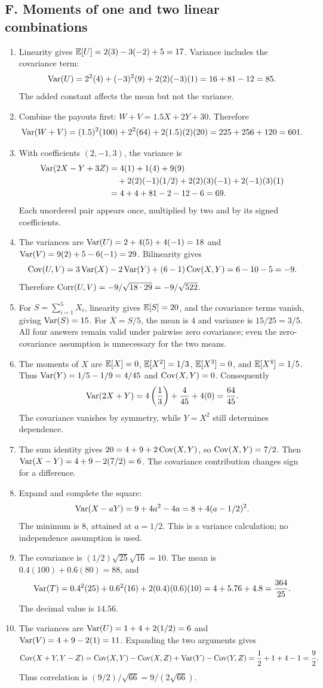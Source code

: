 \subsection{F. Moments of one and two linear combinations}
\begin{enumerate}[label=\textbf{F\arabic*.},leftmargin=*,itemsep=1em]
\item Linearity gives $\mathbb E[U]=2(3)-3(-2)+5=17$. Variance includes the covariance term:
\[
\operatorname{Var}(U)=2^2(4)+(-3)^2(9)+2(2)(-3)(1)=16+81-12=85.
\]
The added constant affects the mean but not the variance.
\item Combine the payouts first: $W+V=1.5X+2Y+30$. Therefore
\[
\operatorname{Var}(W+V)=(1.5)^2(100)+2^2(64)+2(1.5)(2)(20)
=225+256+120=601.
\]
\item With coefficients $(2,-1,3)$, the variance is
\begin{align*}
\operatorname{Var}(2X-Y+3Z)
&=4(1)+1(4)+9(9)\\
&\quad+2(2)(-1)(1/2)+2(2)(3)(-1)+2(-1)(3)(1)\\
&=4+4+81-2-12-6=69.
\end{align*}
Each unordered pair appears once, multiplied by two and by its signed coefficients.
\item The variances are $\operatorname{Var}(U)=2+4(5)+4(-1)=18$ and $\operatorname{Var}(V)=9(2)+5-6(-1)=29$. Bilinearity gives
\[
\operatorname{Cov}(U,V)=3\operatorname{Var}(X)-2\operatorname{Var}(Y)+(6-1)\operatorname{Cov}(X,Y)
=6-10-5=-9.
\]
Therefore $\operatorname{Corr}(U,V)=-9/\sqrt{18\cdot29}=-9/\sqrt{522}$.
\item For $S=\sum_{i=1}^5X_i$, linearity gives $\mathbb E[S]=20$, and the covariance terms vanish, giving $\operatorname{Var}(S)=15$. For $\overline X=S/5$, the mean is $4$ and variance is $15/25=3/5$. All four answers remain valid under pairwise zero covariance; even the zero-covariance assumption is unnecessary for the two means.
\item The moments of $X$ are $\mathbb E[X]=0$, $\mathbb E[X^2]=1/3$, $\mathbb E[X^3]=0$, and $\mathbb E[X^4]=1/5$. Thus $\operatorname{Var}(Y)=1/5-1/9=4/45$ and $\operatorname{Cov}(X,Y)=0$. Consequently
\[
\operatorname{Var}(2X+Y)=4\left(\frac13\right)+\frac4{45}+4(0)=\frac{64}{45}.
\]
The covariance vanishes by symmetry, while $Y=X^2$ still determines dependence.
\item The sum identity gives $20=4+9+2\operatorname{Cov}(X,Y)$, so $\operatorname{Cov}(X,Y)=7/2$. Then $\operatorname{Var}(X-Y)=4+9-2(7/2)=6$. The covariance contribution changes sign for a difference.
\item Expand and complete the square:
\[
\operatorname{Var}(X-aY)=9+4a^2-4a=8+4(a-1/2)^2.
\]
The minimum is $8$, attained at $a=1/2$. This is a variance calculation; no independence assumption is used.
\item The covariance is $(1/2)\sqrt{25}\sqrt{16}=10$. The mean is $0.4(100)+0.6(80)=88$, and
\[
\operatorname{Var}(T)=0.4^2(25)+0.6^2(16)+2(0.4)(0.6)(10)
=4+5.76+4.8=\frac{364}{25}.
\]
The decimal value is $14.56$.
\item The variances are $\operatorname{Var}(U)=1+4+2(1/2)=6$ and $\operatorname{Var}(V)=4+9-2(1)=11$. Expanding the two arguments gives
\[
\operatorname{Cov}(X+Y,Y-Z)=\operatorname{Cov}(X,Y)-\operatorname{Cov}(X,Z)+\operatorname{Var}(Y)-\operatorname{Cov}(Y,Z)
=\frac12+1+4-1=\frac92.
\]
Thus correlation is $(9/2)/\sqrt{66}=9/(2\sqrt{66})$.
\end{enumerate}

